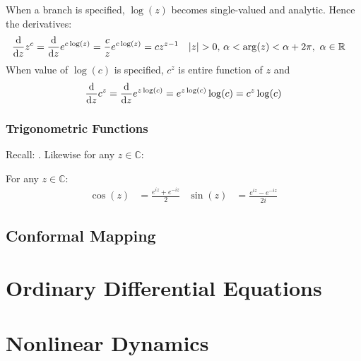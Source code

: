 \documentclass[12pt, english]{book}
\begin{document}
	When a branch is specified, \(\log(z)\) becomes single-valued and analytic. Hence the derivatives: 
	\begin{align*}
		\dv{z} z^c &= \dv{z} e^{c\log(z)} = \frac{c}{z} e^{c \log(z)} = cz^{z-1}
		& \abs{z}>0,& \ \alpha < \arg(z) < \alpha + 2 \pi, \ \alpha \in \mathbb{R}
	\end{align*}
	When value of \(\log(c)\) is specified, \(c^z\) is entire function of \(z\) and
	\begin{align*}
		\dv{z}c^z = \dv{z}e^{z\log(c)} = e^{z\log(c)} \log(c) = c^z \log(c)
	\end{align*}
	
	\section{Trigonometric Functions} \label{Trigonometric Functions Section - Complex}
	
	Recall: . Likewise for any \(z \in \mathbb{C}\):
	
	\begin{definition}
		\label{Sine and Cosine Functions - Complex}
		For any \(z \in \mathbb{C}\):
		\begin{align*}
			\cos(z) &= \frac{e^{iz} + e^{-iz}}{2} &
			\sin(z) &= \frac{e^{iz} - e^{-iz}}{2i} 
		\end{align*}
	\end{definition}
	
	
	
	
	
	
	
	
	
	
	
	
	\chapter{Conformal Mapping} \label{Conformal Mapping Chapter - Complex}
	
	
	
	
	\part{Ordinary Differential Equations} \label{Ordinary Differential Equations Part}
	
	\part{Nonlinear Dynamics} \label{Nonlinear Dynamics Part}
	
\end{document}
